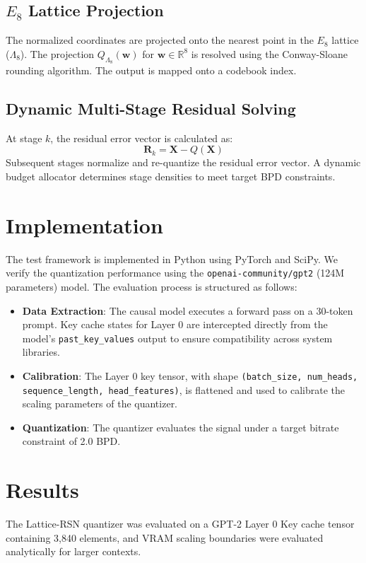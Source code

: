 \documentclass[journal,onecolumn,12pt]{IEEEtran}
\begin{document}
\subsection{$E_8$ Lattice Projection}
The normalized coordinates are projected onto the nearest point in the $E_8$ lattice ($\Lambda_8$). The projection $Q_{\Lambda_8}(\mathbf{w})$ for $\mathbf{w} \in \mathbb{R}^8$ is resolved using the Conway-Sloane rounding algorithm. The output is mapped onto a codebook index.

\subsection{Dynamic Multi-Stage Residual Solving}
At stage $k$, the residual error vector is calculated as:
\begin{equation}
    \mathbf{R}_k = \mathbf{X} - Q(\mathbf{X})
\end{equation}
Subsequent stages normalize and re-quantize the residual error vector. A dynamic budget allocator determines stage densities to meet target BPD constraints.

\section{Implementation}
The test framework is implemented in Python using PyTorch and SciPy. We verify the quantization performance using the \texttt{openai-community/gpt2} (124M parameters) model. The evaluation process is structured as follows:
\begin{itemize}
    \item \textbf{Data Extraction}: The causal model executes a forward pass on a 30-token prompt. Key cache states for Layer 0 are intercepted directly from the model's \texttt{past\_key\_values} output to ensure compatibility across system libraries.
    \item \textbf{Calibration}: The Layer 0 key tensor, with shape \texttt{(batch\_size, num\_heads, sequence\_length, head\_features)}, is flattened and used to calibrate the scaling parameters of the quantizer.
    \item \textbf{Quantization}: The quantizer evaluates the signal under a target bitrate constraint of 2.0 BPD. 
\end{itemize}

\section{Results}
The Lattice-RSN quantizer was evaluated on a GPT-2 Layer 0 Key cache tensor containing 3,840 elements, and VRAM scaling boundaries were evaluated analytically for larger contexts.
\end{document}
